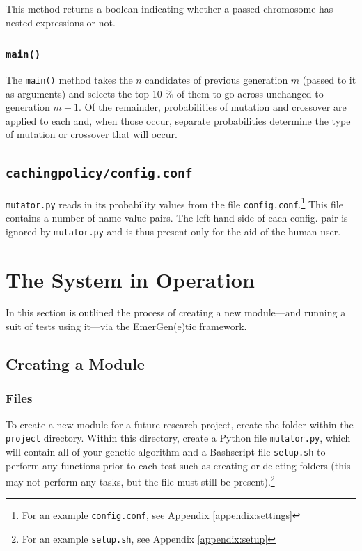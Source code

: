 \documentclass[compsoc,12pt,a4paper]{IEEEtran}
\begin{document}
				This method returns a boolean indicating whether a passed chromosome has nested expressions or not.
			
			\subsubsection{\lstinline|main()|}
			
				The \lstinline|main()| method takes the $n$ candidates of previous generation $m$ (passed to it as arguments) and selects the top 10 \% of them to go across unchanged to generation $m+1$. Of the remainder, probabilities of mutation and crossover are applied to each and, when those occur, separate probabilities determine the type of mutation or crossover that will occur.
				
		\subsection{\lstinline|cachingpolicy/config.conf|}
			
			\lstinline|mutator.py| reads in its probability values from the file \lstinline|config.conf|.\footnote{For an example \lstinline|config.conf|, see Appendix \ref{appendix:settings}} This file contains a number of name-value pairs. The left hand side of each config. pair is ignored by \lstinline|mutator.py| and is thus present only for the aid of the human user.

	\newpage
	
	\section{The System in Operation}
	
		In this section is outlined the process of creating a new module---and running a suit of tests using it---via the EmerGen(e)tic framework.
			
		\subsection{Creating a Module}
			
			\subsubsection{Files}
			
				To create a new module for a future research project, create the folder within the \lstinline|project| directory. Within this directory, create a Python file \lstinline|mutator.py|, which will contain all of your genetic algorithm and a Bashscript file \lstinline|setup.sh| to perform any functions prior to each test such as creating or deleting folders (this may not perform any tasks, but the file must still be present).\footnote{For an example \lstinline|setup.sh|, see Appendix \ref{appendix:setup}}
\end{document}
